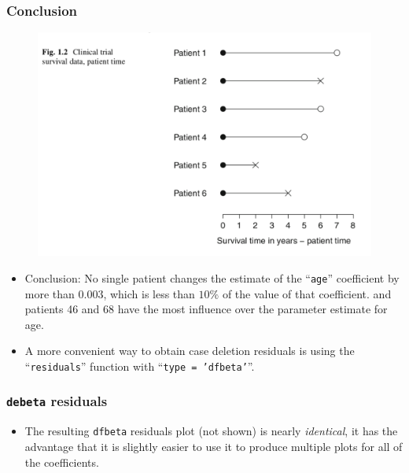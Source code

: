 \documentclass{beamer}
\newcommand{\empr}[1]{{\emph{\color{red}#1}}}
\begin{document}
\pagebreak
\begin{frame}
\frametitle{Conclusion}
\begin{figure}
	\includegraphics[scale = .4]{002.png}
\end{figure}
\begin{itemize}
\item Conclusion: No single patient changes the estimate of the ``\texttt{age}'' coefficient by more than 0.003, which is less than $10\%$ of the value of that coefficient. and patients 46 and 68 have the most influence over the parameter estimate for age.
\item A more convenient way to obtain case deletion residuals is using the ``\texttt{residuals}'' function with ``\texttt{type = 'dfbeta'}''.
\end{itemize}
\end{frame}

\pagebreak
\begin{frame}[fragile]
\frametitle{\texttt{debeta} residuals}
\begin{itemize}
\begin{Verbatim}
> resid.dfbeta <- residuals(result.coxph, type="dfbeta") 
> n.obs <- length(ttr)
> index.obs <- 1:n.obs
> plot(resid.dfbeta[,4] ~ index.obs, type="h",xlab="Observation", 
ylab="Change in coefficient") 
> abline(h=0)
> identify(resid.dfbeta[,4] ~ index.obs)
\end{Verbatim}
\item The resulting \texttt{dfbeta} residuals plot (not shown) is nearly \empr{identical}, it has the advantage that it is slightly easier to use it to produce multiple plots for all of the coefficients. 
\end{itemize}
\end{frame}
\end{document}
